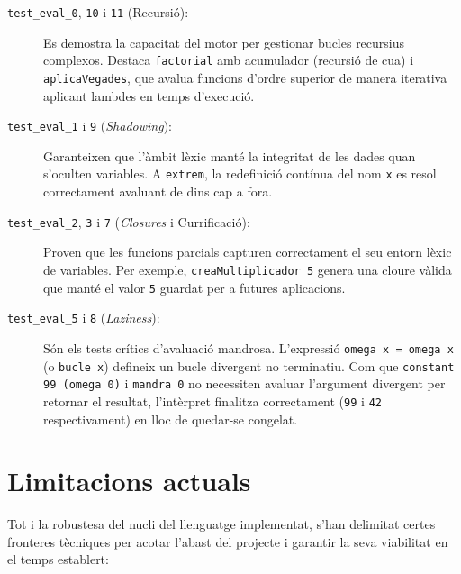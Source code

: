\begin{description}
    \item[\texttt{test\_eval\_0}, \texttt{10} i \texttt{11} (Recursió):] Es demostra la capacitat del motor per gestionar bucles recursius complexos. Destaca \texttt{factorial} amb acumulador (recursió de cua) i \texttt{aplicaVegades}, que avalua funcions d'ordre superior de manera iterativa aplicant lambdes en temps d'execució.
    \item[\texttt{test\_eval\_1} i \texttt{9} (\emph{Shadowing}):] Garanteixen que l'àmbit lèxic manté la integritat de les dades quan s'oculten variables. A \texttt{extrem}, la redefinició contínua del nom \texttt{x} es resol correctament avaluant de dins cap a fora.
    \item[\texttt{test\_eval\_2}, \texttt{3} i \texttt{7} (\emph{Closures} i Currificació):] Proven que les funcions parcials capturen correctament el seu entorn lèxic de variables. Per exemple, \texttt{creaMultiplicador 5} genera una cloure vàlida que manté el valor \texttt{5} guardat per a futures aplicacions.
    \item[\texttt{test\_eval\_5} i \texttt{8} (\emph{Laziness}):] Són els tests crítics d'avaluació mandrosa. L'expressió \texttt{omega x = omega x} (o \texttt{bucle x}) defineix un bucle divergent no terminatiu. Com que \texttt{constant 99 (omega 0)} i \texttt{mandra 0} no necessiten avaluar l'argument divergent per retornar el resultat, l'intèrpret finalitza correctament (\texttt{99} i \texttt{42} respectivament) en lloc de quedar-se congelat.
\end{description}

\section{Limitacions actuals}

Tot i la robustesa del nucli del llenguatge implementat, s'han delimitat certes fronteres tècniques per acotar l'abast del projecte i garantir la seva viabilitat en el temps establert:

